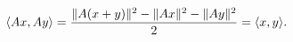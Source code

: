 \documentclass[preview]{standalone}
\begin{document}
\begin{align*}
\special{dvisvgm:raw <g id='unique000'>}\langle Ax,Ay\rangle=\frac{\|A(x+y)\|^2-\|Ax\|^2-\|Ay\|^2}{2}=\langle x,y\rangle.\special{dvisvgm:raw </g>}
\end{align*}
\end{document}
